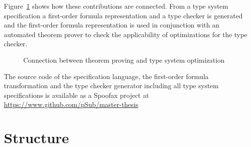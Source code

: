 Figure~\ref{fig:interconnection} shows how these contributions are
connected. From a type system specification a first-order formula
representation and a type checker is generated and the first-order
formula representation is used in conjunction with an automated
theorem prover to check the applicability of optimizations for the
type checker.

\begin{figure}
\label{fig:interconnection}
\caption{Connection between theorem proving and type system optimization}
\end{figure}

The source code of the specification language, the first-order formula
transformation and the type checker generator including all type
system specifications is available as a Spoofax project at
\url{https://www.github.com/pSub/master-thesis}

\section{Structure}



